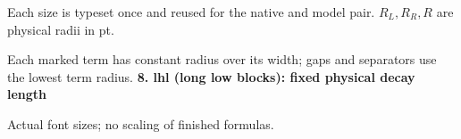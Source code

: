 \documentclass{article}
\newcommand\High{\frac{\displaystyle\sum_{k=1}^n x_k}{1+\frac pq}}
\newcommand\Medium{\frac{x^2+y^2}{z}}
\newcommand\Mark[1]{\directlua{grid.mark(#1)}}
\begin{document}
\par\medskip
Each size is typeset once and reused for the native and model pair. $R_L,R_R,R$ are physical radii in pt.\par
Each marked term has constant radius over its width; gaps and separators use the lowest term radius.
\newpage
{\Large\bfseries 8. lhl (long low blocks): fixed physical decay length}\par\medskip
{} Actual font sizes; no scaling of finished formulas.\par\medskip
\end{document}
